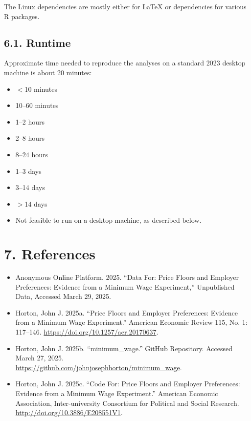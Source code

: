 \documentclass[10pt]{article}
\begin{document}
The Linux dependencies are mostly either for LaTeX or dependencies for various R packages.

\subsection*{6.1. Runtime}

Approximate time needed to reproduce the analyses on a standard 2023 desktop machine is about 20 minutes:
\begin{itemize}[label=]
  \item $<$10 minutes
  \item [\ding{51}] 10--60 minutes
  \item 1--2 hours
  \item 2--8 hours
  \item 8--24 hours
  \item 1--3 days
  \item 3--14 days
  \item $>$14 days
  \item Not feasible to run on a desktop machine, as described below.
\end{itemize}

\vspace{1em}
\section*{7. References}

\begin{itemize}
  \item Anonymous Online Platform. 2025. ``Data For: Price Floors and Employer Preferences: Evidence from a Minimum Wage Experiment,'' Unpublished Data, Accessed March 29, 2025.
  \item Horton, John J. 2025a. ``Price Floors and Employer Preferences: Evidence from a Minimum Wage Experiment.'' American Economic Review 115, No. 1: 117--146. \href{https://doi.org/10.1257/aer.20170637}{https://doi.org/10.1257/aer.20170637}.
  \item Horton, John J. 2025b. ``minimum\_wage.'' GitHub Repository. Accessed March 27, 2025. \\ \href{https://github.com/johnjosephhorton/minimum_wage}{https://github.com/johnjosephhorton/minimum\_wage}.
  \item Horton, John J. 2025c. ``Code For: Price Floors and Employer Preferences: Evidence from a Minimum Wage Experiment.'' American Economic Association, Inter-university Consortium for Political and Social Research. \\ \href{http://doi.org/10.3886/E208551V1}{http://doi.org/10.3886/E208551V1}.
\end{itemize}
\end{document}
